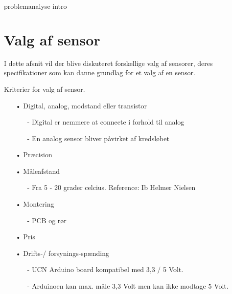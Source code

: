 problemanalyse intro

\section{Valg af sensor}
I dette afsnit vil der blive diskuteret forskellige valg af sensorer, deres specifikationer som kan danne grundlag for et valg af en sensor.

Kriterier for valg af sensor.
\begin{enumerate}
	\item[•]Digital, analog, modstand eller transistor
	    \begin{enumerate}
	        \item[-]Digital er nemmere at connecte i forhold til analog
	        \item[-]En analog sensor bliver påvirket af kredsløbet
	    \end{enumerate}	
	
	\item[•]Præcision 
	\item[•]Måleafstand
		\begin{enumerate}
			\item[-]Fra 5 - 20 grader celcius. Reference: Ib Helmer Nielsen
		\end{enumerate}	
	\item[•]Montering
	    \begin{enumerate}
	        \item[-]PCB og rør
	    \end{enumerate}
	\item[•]Pris
	\item[•]Drifts-/ forsynings-spænding 
	    \begin{enumerate}
	        \item[-]UCN Arduino board kompatibel med 3,3 / 5 Volt.
	        \item[-]Arduinoen kan max. måle 3,3 Volt men kan ikke modtage 5 Volt.
	    \end{enumerate}
	
\end{enumerate}

	